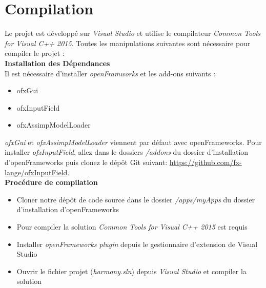 \section{Compilation}
\label{s:compilation}
Le projet est développé sur\textit{ Visual Studio} et utilise le compilateur \textit{Common Tools for Visual C++ 2015}.
Toutes les manipulations suivantes sont nécessaire pour compiler le projet : \\
\newline 
\textbf{Installation des Dépendances} \\
Il est nécessaire d'installer \textit{openFramworks} et les add-ons suivants :
\begin{itemize}
\item ofxGui
\item ofxInputField
\item ofxAssimpModelLoader \\
\end{itemize}

\textit{ofxGui} et \textit{ofxAssimpModelLoader} viennent par défaut avec openFrameworks. Pour installer \textit{ofxInputField}, allez dans le dossiers \textit{/addons} du dossier d'installation d'openFrameworks puis clonez le dépôt Git suivant: \url{https://github.com/fx-lange/ofxInputField}.\\

\textbf{Procédure de compilation}
\begin{itemize}
\item Cloner notre dépôt de code source dans le dossier \textit{/apps/myApps} du dossier d'installation d'openFrameworks
\item Pour compiler la solution \textit{Common Tools for Visual C++ 2015} est requis
\item Installer \textit{openFrameworks plugin} depuis le gestionnaire d'extension de Visual Studio 
\item Ouvrir le fichier projet (\textit{harmony.sln}) depuis \textit{Visual Studio} et compiler la solution
\end{itemize}
